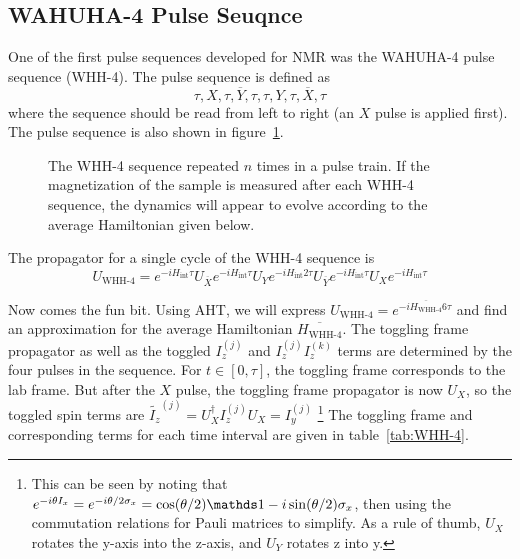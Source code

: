\subsection{WAHUHA-4 Pulse Seuqnce}\label{subsec:WHH-4}

One of the first pulse sequences developed for NMR was the WAHUHA-4 pulse sequence (WHH-4).\cite{PhysRevLett.20.180} The pulse sequence is defined as
\begin{equation}
    \tau, X, \tau, \overline{Y}, \tau, \tau, Y, \tau, \overline{X}, \tau
\end{equation}
where the sequence should be read from left to right (an $X$ pulse is applied first). The pulse sequence is also shown in figure~\ref{fig:WHH-4}.

\begin{figure}[H]
    \centering
    
    \caption{The WHH-4 sequence repeated $n$ times in a pulse train. If the magnetization of the sample is measured after each WHH-4 sequence, the dynamics will appear to evolve according to the average Hamiltonian given below.}
    \label{fig:WHH-4}
\end{figure}

The propagator for a single cycle of the WHH-4 sequence is
\[
U_{\text{WHH-4}} =
    e^{-i H_{\text{int}} \tau} U_{\overline{X}}
    e^{-i H_{\text{int}} \tau} U_Y
    e^{-i H_{\text{int}} 2\tau} U_{\overline{Y}}
    e^{-i H_{\text{int}} \tau} U_X
    e^{-i H_{\text{int}} \tau}
\]

Now comes the fun bit. Using AHT, we will express $U_{\text{WHH-4}} = e^{-i \overline{H_{\text{WHH-4}}} 6\tau}$ and find an approximation for the average Hamiltonian $\overline{H_{\text{WHH-4}}}$. The toggling frame propagator as well as the toggled $I_z^{(j)}$ and $I_z^{(j)}I_z^{(k)}$ terms are determined by the four pulses in the sequence. For $t \in [0, \tau]$, the toggling frame corresponds to the lab frame.
But after the $X$ pulse, the toggling frame propagator is now $U_X$, so the toggled spin terms are $\widetilde{I_z}^{(j)} = U_X^\dagger I_z^{(j)} U_X = I_y^{(j)}$
\footnote{
This can be seen by noting that $e^{-i \theta I_x} = e^{-i \theta/2 \sigma_x} = \cos(\theta/2) \identity - i\sin(\theta/2) \sigma_x$, then using the commutation relations for Pauli matrices to simplify. As a rule of thumb, $U_X$ rotates the y-axis into the z-axis, and $U_Y$ rotates z into y.
}
The toggling frame and corresponding terms for each time interval are given in table~\ref{tab:WHH-4}.


